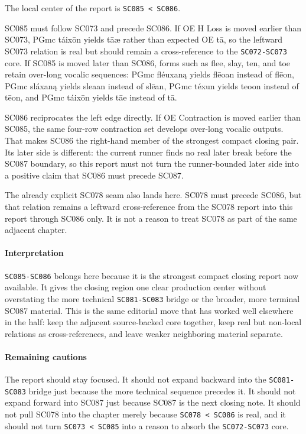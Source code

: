 \documentclass[
  british,
  a4paper,
]{article}
\begin{document}
The local center of the report is \texttt{SC085\ \textless{}\ SC086}.

SC085 must follow SC073 and precede SC086. If OE H Loss is moved earlier
than SC073, PGmc táixōn yields tāæ rather than expected OE tā, so the
leftward SC073 relation is real but should remain a cross-reference to
the \texttt{SC072-SC073} core. If SC085 is moved later than SC086, forms
such as flee, slay, ten, and toe retain over-long vocalic sequences:
PGmc fléuxaną yields flēoan instead of flēon, PGmc sláxaną yields sleaan
instead of slēan, PGmc téxun yields teoon instead of tēon, and PGmc
táixōn yields tāe instead of tā.

SC086 reciprocates the left edge directly. If OE Contraction is moved
earlier than SC085, the same four-row contraction set develops over-long
vocalic outputs. That makes SC086 the right-hand member of the strongest
compact closing pair. Its later side is different: the current runner
finds no real later break before the SC087 boundary, so this report must
not turn the runner-bounded later side into a positive claim that SC086
must precede SC087.

The already explicit SC078 seam also lands here. SC078 must precede
SC086, but that relation remains a leftward cross-reference from the
SC078 report into this report through SC086 only. It is not a reason to
treat SC078 as part of the same adjacent chapter.

\paragraph{Interpretation}\label{interpretation-51}

\texttt{SC085-SC086} belongs here because it is the strongest compact
closing report now available. It gives the closing region one clear
production center without overstating the more technical
\texttt{SC081-SC083} bridge or the broader, more terminal SC087
material. This is the same editorial move that has worked well elsewhere
in the half: keep the adjacent source-backed core together, keep real
but non-local relations as cross-references, and leave weaker
neighboring material separate.

\paragraph{Remaining cautions}\label{remaining-cautions-51}

The report should stay focused. It should not expand backward into the
\texttt{SC081-SC083} bridge just because the more technical sequence
precedes it. It should not expand forward into SC087 just because SC087
is the next closing note. It should not pull SC078 into the chapter
merely because \texttt{SC078\ \textless{}\ SC086} is real, and it should
not turn \texttt{SC073\ \textless{}\ SC085} into a reason to absorb the
\texttt{SC072-SC073} core.
\end{document}
